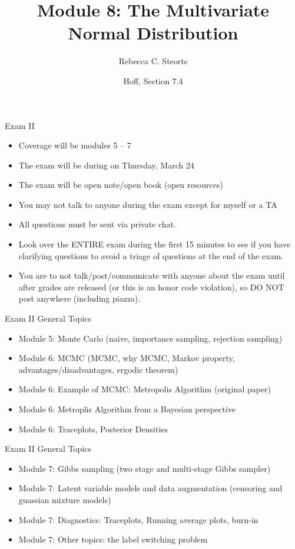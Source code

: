 \documentclass[
  ignorenonframetext,
]{beamer}
\title{Module 8: The Multivariate Normal Distribution}
\author{Rebecca C. Steorts}
\date{Hoff, Section 7.4}
\providecommand{\tightlist}{%
  \setlength{\itemsep}{0pt}\setlength{\parskip}{0pt}}
\begin{document}
\frame{\titlepage}

\begin{frame}{Exam II}
\protect\hypertarget{exam-ii}{}

\begin{itemize}
\tightlist
\item
  Coverage will be modules 5 -- 7
\item
  The exam will be during on Thursday, March 24
\item
  The exam will be open note/open book (open resources)
\item
  You may not talk to anyone during the exam except for myself or a TA
\item
  All questions must be sent via private chat.
\item
  Look over the ENTIRE exam during the first 15 minutes to see if you
  have clarifying questions to avoid a triage of questions at the end of
  the exam.
\item
  You are to not talk/post/communicate with anyone about the exam until
  after grades are released (or this is an honor code violation), so DO
  NOT post anywhere (including piazza).
\end{itemize}

\end{frame}

\begin{frame}{Exam II General Topics}
\protect\hypertarget{exam-ii-general-topics}{}

\begin{itemize}
\tightlist
\item
  Module 5: Monte Carlo (naive, importance sampling, rejection sampling)
\item
  Module 6: MCMC (MCMC, why MCMC, Markov property,
  advantages/disadvantages, ergodic theorem)
\item
  Module 6: Example of MCMC: Metropolis Algorithm (original paper)
\item
  Module 6: Metroplis Algorithm from a Bayesian perspective
\item
  Module 6: Traceplots, Posterior Densities
\end{itemize}

\end{frame}

\begin{frame}{Exam II General Topics}
\protect\hypertarget{exam-ii-general-topics-1}{}

\begin{itemize}
\tightlist
\item
  Module 7: Gibbs sampling (two stage and multi-stage Gibbs sampler)
\item
  Module 7: Latent variable models and data augmentation (censoring and
  guassian mixture models)
\item
  Module 7: Diagnostics: Traceplots, Running average plots, burn-in
\item
  Module 7: Other topics: the label switching problem
\end{itemize}

\end{frame}
\end{document}
